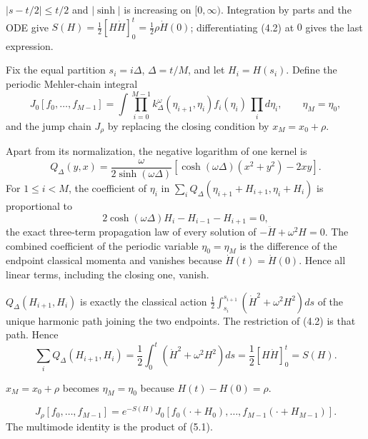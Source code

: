 \documentclass[11pt,a4paper]{article}
\begin{document}
\Because $|s-t/2|\le t/2$ and $|\sinh|$ is increasing on $[0,\infty)$.
Integration by parts and the ODE give
$S(H)=\frac12[H\dot H]_0^t=\frac12\rho\dot H(0)$; differentiating (4.2) at
$0$ gives the last expression.

\QedStep


Fix the equal partition $s_i=i\Delta$, $\Delta=t/M$, and let
$H_i=H(s_i)$.  Define the periodic Mehler-chain integral
\[
 J_0[f_0,\ldots,f_{M-1}]
 =\int\prod_{i=0}^{M-1}k_{\Delta}^\omega(\eta_{i+1},\eta_i)
 f_i(\eta_i)\,\prod_i d\eta_i,\qquad \eta_M=\eta_0,
\]
and the jump chain $J_\rho$ by replacing the closing condition by
$x_M=x_0+\rho$.


\Because Apart from its normalization, the negative logarithm of one kernel is
\[
 Q_\Delta(y,x)=\frac{\omega}{2\sinh(\omega\Delta)}
 [\cosh(\omega\Delta)(x^2+y^2)-2xy].
\]
For $1\le i<M$, the coefficient of $\eta_i$ in
$\sum_iQ_\Delta(\eta_{i+1}+H_{i+1},\eta_i+H_i)$ is proportional to
\[
 2\cosh(\omega\Delta)H_i-H_{i-1}-H_{i+1}=0,
\]
the exact three-term propagation law of every solution of
$-\ddot H+\omega^2H=0$.  The combined coefficient of the periodic variable
$\eta_0=\eta_M$ is the difference of the endpoint classical momenta and vanishes
because $\dot H(t)=\dot H(0)$.  Hence all linear terms, including the closing
one, vanish.


\Because $Q_\Delta(H_{i+1},H_i)$ is exactly the classical action
$\frac12\int_{s_i}^{s_{i+1}}(\dot H^2+\omega^2H^2)ds$ of the unique harmonic
path joining the two endpoints.  The restriction of (4.2) is that path.  Hence
\[
 \sum_iQ_\Delta(H_{i+1},H_i)
 =\frac12\int_0^t(\dot H^2+\omega^2H^2)ds
 =\frac12[H\dot H]_0^t=S(H).
\]

$x_M=x_0+\rho$ becomes $\eta_M=\eta_0$ because $H(t)-H(0)=\rho$.

\[
 J_\rho[f_0,\ldots,f_{M-1}]
 =e^{-S(H)}J_0[f_0(\cdot+H_0),\ldots,f_{M-1}(\cdot+H_{M-1})].
\tag{5.1}
\]
The multimode identity is the product of (5.1).

\QedStep
\end{document}
